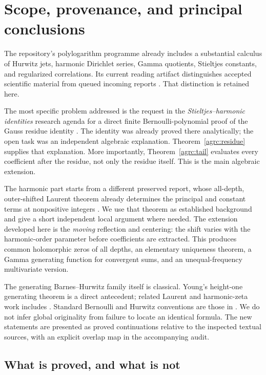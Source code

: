 \documentclass[11pt]{article}
\numberwithin{equation}{section}
\theoremstyle{definition}\newtheorem{definition}[theorem]{Definition}
\theoremstyle{remark}\newtheorem{remark}[theorem]{Remark}
\begin{document}
\section{Scope, provenance, and principal conclusions}
\label{agrc:scope}

The repository's polylogarithm programme already includes a substantial
calculus of Hurwitz jets, harmonic Dirichlet series, Gamma quotients,
Stieltjes constants, and regularized correlations. Its current reading
artifact distinguishes accepted scientific material from queued incoming
reports \cite{repo-manuscript}. That distinction is retained here.

The most specific problem addressed is the request in the
\emph{Stieltjes--harmonic identities} research agenda for a direct finite
Bernoulli-polynomial proof of the Gauss residue identity
\cite{repo-agenda,repo-gauss}. The identity was already proved there
analytically; the open task was an independent algebraic explanation.
Theorem~\ref{agrc:residue} supplies that explanation. More importantly,
Theorem~\ref{agrc:tail} evaluates every coefficient after the residue,
not only the residue itself. This is the main algebraic extension.

The harmonic part starts from a different preserved report, whose
all-depth, outer-shifted Laurent theorem already determines the principal
and constant terms at nonpositive integers \cite{repo-laurent}. We use
that theorem as established background and give a short independent
local argument where needed. The extension developed here is the
\emph{moving} reflection and centering: the shift varies with the
harmonic-order parameter before coefficients are extracted. This
produces common holomorphic zeros of all depths, an elementary
uniqueness theorem, a Gamma generating function for convergent sums,
and an unequal-frequency multivariate version.

The generating Barnes--Hurwitz family itself is classical. Young's
height-one generating theorem \cite{Young2024} is a direct antecedent;
related Laurent and harmonic-zeta work includes
\cite{Young2023,Can2024}. Standard Bernoulli and Hurwitz conventions are
those in \cite{DLMF24,DLMF25}. We do not infer global originality from
failure to locate an identical formula. The new statements are presented
as proved continuations relative to the inspected textual sources, with
an explicit overlap map in the accompanying audit.

\subsection{What is proved, and what is not}
\end{document}
